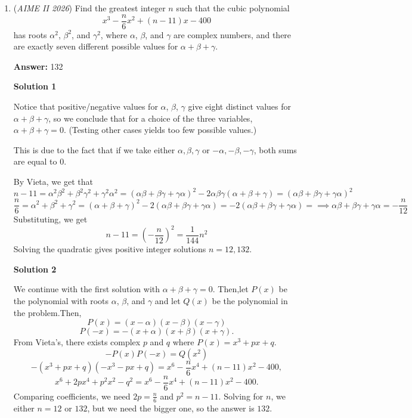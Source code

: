 \begin{enumerate}
 The greatest possible value of $BC$ is $340$.

 


	\item (\textit{AIME II 2026}) Find the greatest integer $n$ such that the cubic polynomial
 \[x^{3} -\frac{n}{6}x^{2} + (n - 11)x - 400\]has roots $\alpha^{2}$, $\beta^{2}$, and $\gamma^{2}$, where $\alpha$, $\beta$, and $\gamma$ are complex numbers, and there are exactly seven different possible values for $\alpha + \beta + \gamma$.


 
 \textbf{Answer: }132



\textbf{Solution 1}

Notice that positive/negative values for $\alpha$, $\beta$, $\gamma$ give eight distinct values for $\alpha+\beta+\gamma$, so we conclude that for a choice of the three variables, $\alpha+\beta+\gamma=0$. (Testing other cases yields too few possible values.)

 This is due to the fact that if we take either $\alpha,\beta,\gamma$ or $-\alpha,-\beta,-\gamma$, both sums are equal to $0$.

 By Vieta, we get that
 \[n-11=\alpha^2\beta^2+\beta^2\gamma^2+\gamma^2\alpha^2=(\alpha\beta+\beta\gamma+\gamma\alpha)^2-2\alpha\beta\gamma(\alpha+\beta+\gamma)=(\alpha\beta+\beta\gamma+\gamma\alpha)^2\]
 \[\frac{n}{6}=\alpha^2+\beta^2+\gamma^2=(\alpha+\beta+\gamma)^2-2(\alpha\beta+\beta\gamma+\gamma\alpha)=-2(\alpha\beta+\beta\gamma+\gamma\alpha)=\implies \alpha\beta+\beta\gamma+\gamma\alpha=-\frac{n}{12}\]Substituting, we get
 \[n-11=\left(-\frac{n}{12}\right)^2=\frac{1}{144}n^2\]Solving the quadratic gives positive integer solutions $n=12,\boxed{132}$.

 



\textbf{Solution 2}

We continue with the first solution with $\alpha + \beta + \gamma = 0$. Then,let $P(x)$ be the polynomial with roots $\alpha$, $\beta$, and $\gamma$ and let $Q(x)$ be the polynomial in the problem.Then,
 \[P(x) = (x-\alpha) (x-\beta) (x-\gamma)\]
 \[P(-x) = -(x + \alpha)(x + \beta)(x + \gamma).\]From Vieta's, there exists complex $p$ and $q$ where $P(x) = x^3 + px + q$.
 \[-P(x)P(-x) = Q(x^2)\]
 \[-(x^3 + px + q)(-x^3 - px + q) = x^6 - \frac{n}{6} x^4 + (n-11)x^2 - 400,\]
 \[x^6 + 2px^4 + p^2x^2 - q^2 = x^6 - \frac{n}{6} x^4 + (n-11)x^2 - 400.\]Comparing coefficients, we need $2p = \frac{n}{6}$ and $p^2 = n-11$. Solving for $n$, we either $n = 12$ or $132$, but we need the bigger one, so the answer is $\boxed{132}$.


\end{enumerate}
